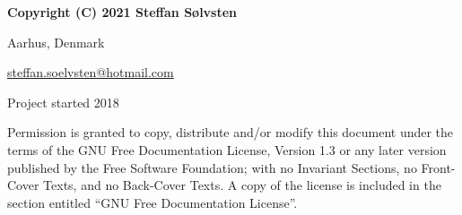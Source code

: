 \textbf{Copyright (C) 2021 Steffan Sølvsten}

Aarhus, Denmark

\href{mailto:steffan.soelvsten@hotmail.com}{steffan.soelvsten@hotmail.com}

\vspace{1em}
\noindent Project started 2018

\vspace{1em}
\noindent Permission is granted to copy, distribute and/or modify this document
under the terms of the GNU Free Documentation License, Version 1.3 or any later
version published by the Free Software Foundation; with no Invariant Sections,
no Front-Cover Texts, and no Back-Cover Texts. A copy of the license is included
in the section entitled ``GNU Free Documentation License''.
